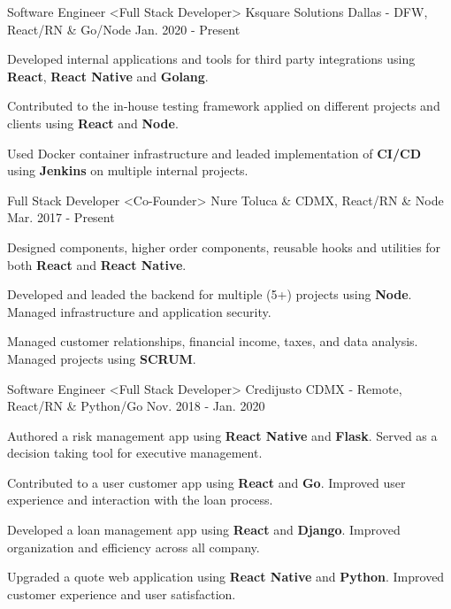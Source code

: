 \begin{cventries}
  \cventry
    {Software Engineer <Full Stack Developer>}
    {Ksquare Solutions}
    {Dallas - DFW, React/RN \& Go/Node}
    {Jan. 2020 - Present}
    {
      \begin{cvitems}
        \item {Developed internal applications and tools for third party integrations using \textbf{React}, \textbf{React Native} and \textbf{Golang}.}
        \item {Contributed to the in-house testing framework applied on different projects and clients using \textbf{React} and \textbf{Node}.}
        \item {Used Docker container infrastructure and leaded implementation of \textbf{CI/CD} using \textbf{Jenkins} on multiple internal projects.}
      \end{cvitems}
    }
  \cventry
    {Full Stack Developer <Co-Founder>}
    {Nure}
    {Toluca \& CDMX, React/RN \& Node}
    {Mar. 2017 - Present}
    {
      \begin{cvitems}
        \item {Designed components, higher order components, reusable hooks and utilities for both \textbf{React} and \textbf{React Native}.}
        \item {Developed and leaded the backend for multiple (5+) projects using \textbf{Node}. Managed infrastructure and application security.}
         \item {Managed customer relationships, financial income, taxes, and data analysis. Managed projects using \textbf{SCRUM}.}
      \end{cvitems}
    }
  \cventry
    {Software Engineer <Full Stack Developer>}
    {Credijusto}
    {CDMX - Remote, React/RN \& Python/Go}
    {Nov. 2018 - Jan. 2020}
    {
      \begin{cvitems}
        \item {Authored a risk management app using \textbf{React Native} and \textbf{Flask}. Served as a decision taking tool for executive management.}
        \item {Contributed to a user customer app using \textbf{React} and \textbf{Go}. Improved user experience and interaction with the loan process.}
        \item {Developed a loan management app using \textbf{React} and \textbf{Django}. Improved organization and efficiency across all company.}
        \item {Upgraded a quote web application using \textbf{React Native} and \textbf{Python}. Improved customer experience and user satisfaction.}

\end{cvitems}}
\end{cventries}
